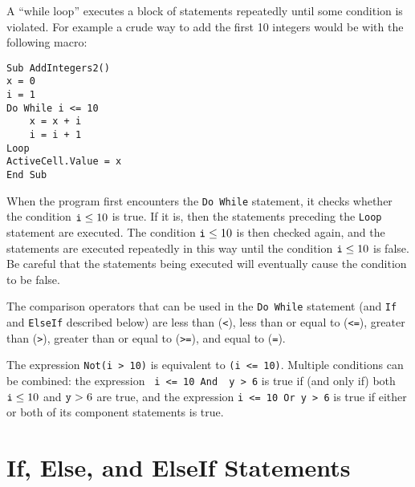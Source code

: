 {A ``while loop'' executes a block of statements repeatedly until some condition is violated.  For example a crude way to add the first 10 integers would be with the following macro:

\small\begin{verbatim}
Sub AddIntegers2()
x = 0
i = 1
Do While i <= 10
    x = x + i
    i = i + 1
Loop
ActiveCell.Value = x
End Sub
\end{verbatim}\normalsize

When the program first encounters the \verb!Do While! statement, it checks whether the condition $\verb!i! \leq 10$ is true.  If it is, then the statements preceding the \verb!Loop! statement are executed.  The condition $\verb!i!\leq 10$ is then checked again, and the statements are executed repeatedly in this way until the condition $\verb!i! \leq 10$ is false.  Be careful that the statements being executed will eventually cause the condition to be false.  

The comparison operators that can be used in the \verb!Do While! statement (and \verb!If! and \verb!ElseIf! described below) are less than (\verb!<!), less than or equal to (\verb!<=!), greater than (\verb!>!), greater than or equal to (\verb!>=!), and equal to (\verb!=!).  

The expression \verb!Not(i > 10)! is equivalent to \verb!(i <= 10)!.  Multiple conditions can be combined: the expression \verb! i <= 10 And  y > 6!
is true if (and only if) both $\verb!i!\leq 10$ and $\verb!y!>6$ are true, and the expression 
\verb!i <= 10 Or y > 6! is true if either or both of its component statements is true.  

\section{If, Else, and ElseIf Statements}

}
